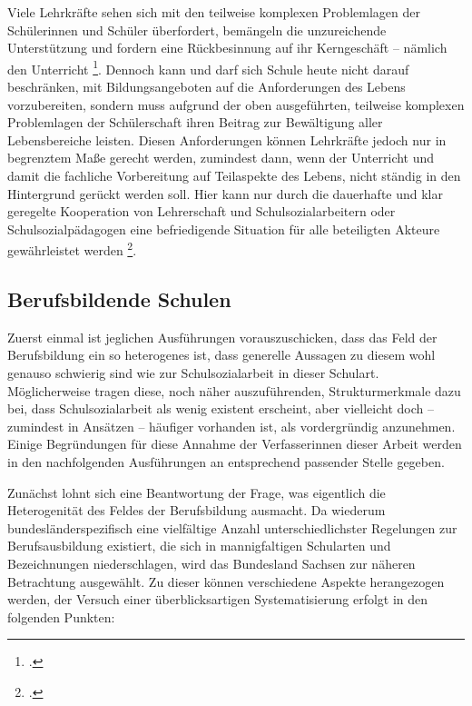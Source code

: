 Viele Lehrkräfte sehen sich mit den teilweise komplexen Problemlagen der Schülerinnen und Schüler überfordert, bemängeln die unzureichende Unterstützung und fordern eine Rückbesinnung auf ihr Kerngeschäft -- nämlich den Unterricht \footcite[vgl.][10]{Drilling2009}. Dennoch kann und darf sich Schule heute nicht darauf beschränken, mit Bildungsangeboten auf die Anforderungen des Lebens vorzubereiten, sondern muss aufgrund der oben ausgeführten, teilweise komplexen Problemlagen der Schülerschaft ihren Beitrag zur Bewältigung aller Lebensbereiche leisten. Diesen Anforderungen können Lehrkräfte jedoch nur in begrenztem Maße gerecht werden, zumindest dann, wenn der Unterricht und damit die fachliche Vorbereitung auf Teilaspekte des Lebens, nicht ständig in den Hintergrund gerückt werden soll. Hier kann nur durch die dauerhafte und klar geregelte Kooperation von Lehrerschaft und Schulsozialarbeitern oder Schulsozialpädagogen eine befriedigende Situation für alle beteiligten Akteure gewährleistet werden \footcite[vgl.][9ff]{Drilling2009}. 

\subsection{Berufsbildende Schulen}
\label{sec:BerufsbildendeSchulen}
   
Zuerst einmal ist jeglichen Ausführungen vorauszuschicken, dass das Feld der Berufsbildung ein so heterogenes ist, dass generelle Aussagen zu diesem wohl genauso schwierig sind wie zur Schulsozialarbeit in dieser Schulart. Möglicherweise tragen diese, noch näher auszuführenden, Strukturmerkmale dazu bei, dass Schulsozialarbeit als wenig existent erscheint, aber vielleicht doch -- zumindest in Ansätzen -- häufiger vorhanden ist, als vordergründig anzunehmen. Einige Begründungen für diese Annahme der Verfasserinnen dieser Arbeit werden in den nachfolgenden Ausführungen an entsprechend passender Stelle gegeben. 

Zunächst lohnt sich eine Beantwortung der Frage, was eigentlich die Heterogenität des Feldes der Berufsbildung ausmacht. Da wiederum bundesländerspezifisch eine vielfältige Anzahl unterschiedlichster Regelungen zur Berufsausbildung existiert, die sich in mannigfaltigen Schularten und Bezeichnungen niederschlagen, wird das Bundesland Sachsen zur näheren Betrachtung ausgewählt. Zu dieser können verschiedene Aspekte herangezogen werden, der Versuch einer überblicksartigen Systematisierung erfolgt in den folgenden Punkten:\\

